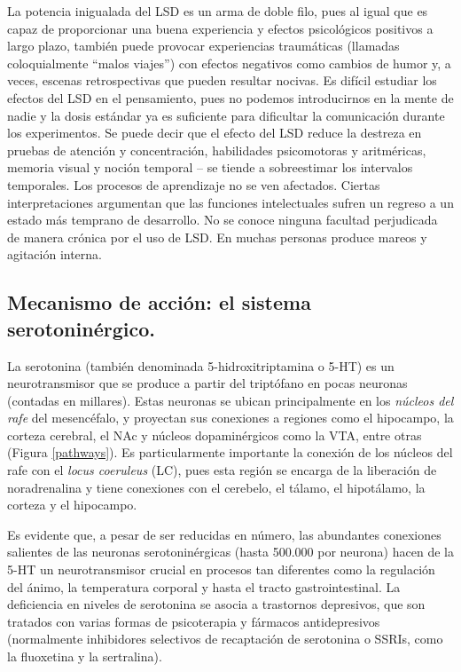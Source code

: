 La potencia inigualada del LSD es un arma de doble filo, pues al igual que es capaz de proporcionar una buena experiencia y efectos psicológicos positivos a largo plazo, también puede provocar experiencias traumáticas (llamadas coloquialmente \enquote{malos viajes}) con efectos negativos como cambios de humor y, a veces, escenas retrospectivas que pueden resultar nocivas. Es difícil estudiar los efectos del LSD en el pensamiento, pues no podemos introducirnos en la mente de nadie y la dosis estándar ya es suficiente para dificultar la comunicación durante los experimentos. Se puede decir que el efecto del LSD reduce la destreza en pruebas de atención y concentración, habilidades psicomotoras y aritméricas, memoria visual y noción temporal – se tiende a sobreestimar los intervalos temporales. Los procesos de aprendizaje no se ven afectados. Ciertas interpretaciones argumentan que las funciones intelectuales sufren un regreso a un estado más temprano de desarrollo. No se conoce ninguna facultad perjudicada de manera crónica por el uso de LSD. En muchas personas produce mareos y agitación interna.

\subsection{Mecanismo de acción: el sistema serotoninérgico.}

La serotonina (también denominada 5-hidroxitriptamina o 5-HT) es un neurotransmisor que se produce a partir del triptófano en pocas neuronas (contadas en millares). Estas neuronas se ubican principalmente en los \textit{núcleos del rafe} del mesencéfalo, y proyectan sus conexiones a regiones como el hipocampo, la corteza cerebral, el NAc y núcleos dopaminérgicos como la VTA, entre otras (Figura \ref{pathways}). Es particularmente importante la conexión de los núcleos del rafe con el \textit{locus coeruleus} (LC), pues esta región se encarga de la liberación de noradrenalina y tiene conexiones con el cerebelo, el tálamo, el hipotálamo, la corteza y el hipocampo.

Es evidente que, a pesar de ser reducidas en número, las abundantes conexiones salientes de las neuronas serotoninérgicas (hasta 500.000 por neurona) hacen de la 5-HT un neurotransmisor crucial en procesos tan diferentes como la regulación del ánimo, la temperatura corporal y hasta el tracto gastrointestinal. La deficiencia en niveles de serotonina se asocia a trastornos depresivos, que son tratados con varias formas de psicoterapia y fármacos antidepresivos (normalmente inhibidores selectivos de recaptación de serotonina o SSRIs, como la fluoxetina y la sertralina).

